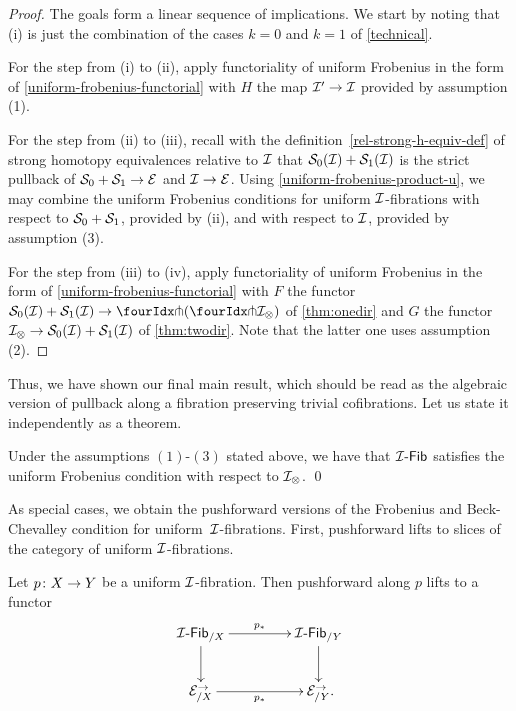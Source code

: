 \documentclass[reqno,10pt,a4paper,oneside,draft]{amsart}
\begin{document}
\begin{proof}
The goals form a linear sequence of implications.
We start by noting that (i) is just the combination of the cases $k = 0$ and $k = 1$ of \cref{technical}.

For the step from (i) to (ii), apply functoriality of uniform Frobenius in the form of \cref{uniform-frobenius-functorial} with $H$ the map $\cal{I}' \to \cal{I}$ provided by assumption (1).

For the step from (ii) to (iii), recall with the definition~\eqref{rel-strong-h-equiv-def} of strong homotopy equivalences relative to $\cal{I}$ that $\cal{S}_0(\cal{I}) + \cal{S}_1(\cal{I})$ is the strict pullback of $\cal{S}_0 + \cal{S}_1 \to \cal{E}$ and $\cal{I} \to \cal{E}$.
Using \cref{uniform-frobenius-product-u}, we may combine the uniform Frobenius conditions for uniform $\cal{I}$-fibrations with respect to $\cal{S}_0 + \cal{S}_1$, provided by (ii), and with respect to $\cal{I}$, provided by assumption (3).

For the step from (iii) to (iv), apply functoriality of uniform Frobenius in the form of \cref{uniform-frobenius-functorial} with $F$ the functor $\cal{S}_0(\cal{I}) + \cal{S}_1(\cal{I}) \to \liftl{(\liftr{\cal{I}_\otimes})}$ of \cref{thm:onedir} and $G$ the functor $\cal{I}_\otimes \to \cal{S}_0(\cal{I}) + \cal{S}_1(\cal{I})$ of \cref{thm:twodir}.
Note that the latter one uses assumption (2).
\end{proof}

Thus, we have shown our final main result, which should be read as the algebraic version of pullback along a fibration preserving trivial cofibrations.
Let us state it independently as a theorem.

\begin{theorem} \label{uniform-fibrations-uniform-frobenius}
Under the assumptions $(1)$-$(3)$ stated above, we have that $\Fib{\cal{I}} $ satisfies the uniform Frobenius condition with respect to $\cal{I}_{\otimes}$.
\qed
\end{theorem}

As special cases, we obtain the pushforward versions of the Frobenius and Beck-Chevalley condition for uniform~$\cal{I}$-fibrations.
First, pushforward lifts to slices of the category of uniform $\cal{I}$-fibrations.

\begin{corollary} \label{uniform-fibrations-frobenius-pushforward}
Let $p \co X \to Y$ be a uniform $\cal{I}$-fibration.
Then pushforward along $p$ lifts to a functor
\[
\xymatrix@C+2em{
  \Fib{\cal{I}}_{/X}
  \ar[r]^{p_*}
  \ar[d]
&
  \Fib{\cal{I}}_{/Y}
  \ar[d]
\\
  \catE_{/X}^\to
  \ar[r]_{p_*}
&
  \catE_{/Y}^\to
\rlap{.}}
\]
\end{corollary}
\end{document}
